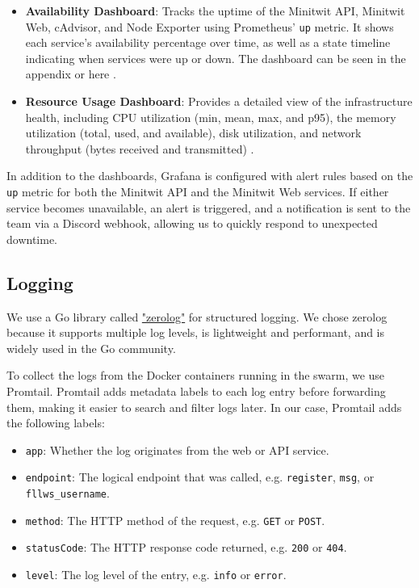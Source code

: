 \begin{itemize}
    \item \textbf{Availability Dashboard}: Tracks the uptime of the Minitwit API, Minitwit Web, cAdvisor, and Node Exporter using Prometheus' \texttt{up} metric. It shows each service's availability percentage over time, as well as a state timeline indicating when services were up or down. The dashboard can be seen in the appendix or here .
    \item \textbf{Resource Usage Dashboard}: Provides a detailed view of the infrastructure health, including CPU utilization (min, mean, max, and p95), the memory utilization (total, used, and available), disk utilization, and network throughput (bytes received and transmitted) .
\end{itemize}

In addition to the dashboards, Grafana is configured with alert rules based on the \texttt{up} metric for both the Minitwit API and the Minitwit Web services. If either service becomes unavailable, an alert is triggered, and a notification is sent to the team via a Discord webhook, allowing us to quickly respond to unexpected downtime.

\subsection{Logging}
We use a Go library called \href{https://github.com/rs/zerolog}{"zerolog"} for structured logging. We chose zerolog because it supports multiple log levels, is lightweight and performant, and is widely used in the Go community.

To collect the logs from the Docker containers running in the swarm, we use Promtail. Promtail adds metadata labels to each log entry before forwarding them, making it easier to search and filter logs later. In our case, Promtail adds the following labels:

\begin{itemize}
    \item \texttt{app}: Whether the log originates from the web or API service.
    \item \texttt{endpoint}: The logical endpoint that was called, e.g. \texttt{register}, \texttt{msg}, or \texttt{fllws\_username}.
    \item \texttt{method}: The HTTP method of the request, e.g. \texttt{GET} or \texttt{POST}.
    \item \texttt{statusCode}: The HTTP response code returned, e.g. \texttt{200} or \texttt{404}.
    \item \texttt{level}: The log level of the entry, e.g. \texttt{info} or \texttt{error}.
\end{itemize}

